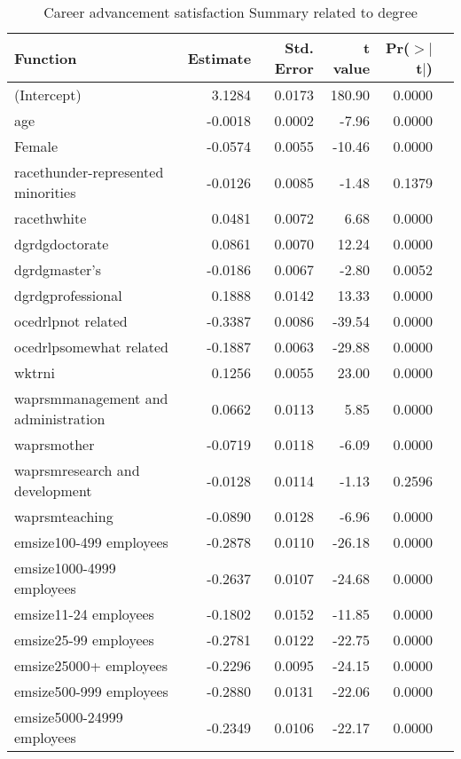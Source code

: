 \documentclass[12pt]{article}
\begin{document}
\begin{table}[H]
\centering
\caption{Career advancement satisfaction Summary related to degree} 
\label{tab:career advancement satisfaction model}
\begin{tabular}{|l|r|r|r|r|r|}
  \toprule
 Function & Estimate & Std. Error & t value & Pr($>$$|$t$|$) \\ \hline
  \midrule
(Intercept) & 3.1284 & 0.0173 & 180.90 & 0.0000 \\ \hline
  age & -0.0018 & 0.0002 & -7.96 & 0.0000 \\ \hline
  Female & -0.0574 & 0.0055 & -10.46 & 0.0000 \\ \hline
  racethunder-represented minorities & -0.0126 & 0.0085 & -1.48 & 0.1379 \\ \hline
  racethwhite & 0.0481 & 0.0072 & 6.68 & 0.0000 \\ \hline
  dgrdgdoctorate & 0.0861 & 0.0070 & 12.24 & 0.0000 \\ \hline
  dgrdgmaster's & -0.0186 & 0.0067 & -2.80 & 0.0052 \\ \hline
  dgrdgprofessional & 0.1888 & 0.0142 & 13.33 & 0.0000 \\ \hline
  ocedrlpnot related & -0.3387 & 0.0086 & -39.54 & 0.0000 \\ \hline
  ocedrlpsomewhat related & -0.1887 & 0.0063 & -29.88 & 0.0000 \\ \hline
  wktrni & 0.1256 & 0.0055 & 23.00 & 0.0000 \\ \hline
  waprsmmanagement and administration & 0.0662 & 0.0113 & 5.85 & 0.0000 \\ \hline
  waprsmother & -0.0719 & 0.0118 & -6.09 & 0.0000 \\ \hline
  waprsmresearch and development & -0.0128 & 0.0114 & -1.13 & 0.2596 \\ \hline
  waprsmteaching & -0.0890 & 0.0128 & -6.96 & 0.0000 \\ \hline
  emsize100-499 employees & -0.2878 & 0.0110 & -26.18 & 0.0000 \\ \hline
  emsize1000-4999 employees & -0.2637 & 0.0107 & -24.68 & 0.0000 \\ \hline
  emsize11-24 employees & -0.1802 & 0.0152 & -11.85 & 0.0000 \\ \hline
  emsize25-99 employees & -0.2781 & 0.0122 & -22.75 & 0.0000 \\ \hline
  emsize25000+ employees & -0.2296 & 0.0095 & -24.15 & 0.0000 \\ \hline
  emsize500-999 employees & -0.2880 & 0.0131 & -22.06 & 0.0000 \\ \hline
  emsize5000-24999 employees & -0.2349 & 0.0106 & -22.17 & 0.0000 \\ \hline
   \bottomrule
\end{tabular}
\end{table}
\end{document}
